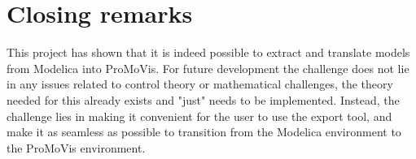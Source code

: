 \section{Closing remarks}
This project has shown that it is indeed possible to extract and translate models from Modelica into ProMoVis. For future development the challenge does not lie in any issues related to control theory or mathematical challenges, the theory needed for this already exists and "just" needs to be implemented. Instead, the challenge lies in making it convenient for the user to use the export tool, and make it as seamless as possible to transition from the Modelica environment to the ProMoVis environment. 
